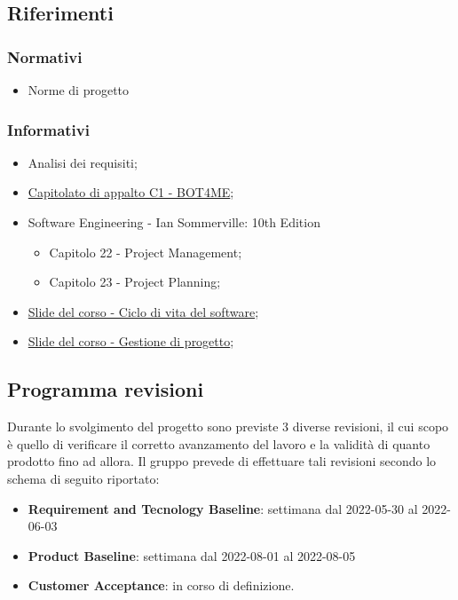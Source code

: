 \subsection{Riferimenti}

\subsubsection{Normativi}
\begin{itemize}
    \item Norme di progetto
\end{itemize}

\subsubsection{Informativi}
\begin{itemize}
    \item Analisi dei requisiti;
    \item  \href{https://www.math.unipd.it/~tullio/IS-1/2021/Progetto/C1.pdf}{\color{blue} Capitolato di appalto C1 - BOT4ME};
    \item Software Engineering - Ian Sommerville: 10th Edition
    \begin{itemize}
        \item Capitolo 22 - Project Management;
        \item Capitolo 23 - Project Planning;
    \end{itemize}
    \item \href{https://www.math.unipd.it/~tullio/IS-1/2021/Dispense/T05.pdf}{\color{blue} Slide del corso - Ciclo di vita del software};
    \item \href{https://www.math.unipd.it/~tullio/IS-1/2021/Dispense/T06.pdf}{\color{blue} Slide del corso - Gestione di progetto};
\end{itemize}

\subsection{Programma revisioni}
Durante lo svolgimento del progetto sono previste 3 diverse revisioni, il cui scopo è quello di verificare il corretto avanzamento del lavoro e la validità di quanto prodotto fino ad allora. 
Il gruppo prevede di effettuare tali revisioni secondo lo schema di seguito riportato: 
\begin{itemize}
    \item \textbf{Requirement and Tecnology Baseline}: settimana dal 2022-05-30 al 2022-06-03
    \item \textbf{Product Baseline}: settimana dal 2022-08-01 al 2022-08-05
    \item \textbf{Customer Acceptance}: in corso di definizione.
\end{itemize}
\newpage

